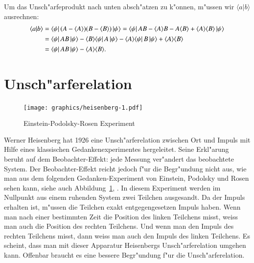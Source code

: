 Um das Unsch"arfeprodukt nach unten absch"atzen zu k"onnen, m"ussen
wir $\langle a|b\rangle$ ausrechnen:
\begin{align}
\langle a|b\rangle
&=
\langle\psi|\,
(A-\langle A\rangle)(B-\langle B\rangle)
\,|\psi\rangle
=
\langle\psi|\,
AB-\langle A\rangle B-A\langle B\rangle
+
\langle A\rangle\langle B\rangle
\,|\psi\rangle
\notag
\\
&=
\langle\psi|\,AB\,|\psi\rangle
-\langle B\rangle\langle\psi|\,A\,|\psi\rangle
-\langle A\rangle\langle\psi|\,B\,|\psi\rangle
+
\langle A\rangle\langle B\rangle
\notag
\\
&=
\langle\psi|\,AB\,|\psi\rangle
-
\langle A\rangle\langle B\rangle.
\label{skript:abausrechnung}
\end{align}

%
%
\section{Unsch"arferelation}
\begin{figure}
\centering
\texttt{[image: graphics/heisenberg-1.pdf]}
\caption{Einstein-Podolsky-Rosen Experiment
\label{skript:epr-experiment}}
\end{figure}
Werner Heisenberg hat 1926 eine Unsch"arferelation zwischen Ort und Impuls
mit Hilfe eines klassischen Gedankenexperimentes hergeleitet.
Seine Erkl"arung beruht auf dem Beobachter-Effekt: jede Messung
ver"andert das beobachtete System.
Der Beobachter-Effekt reicht jedoch f"ur die Begr"undung nicht
aus, wie man aus dem folgenden Gedanken-Experiment von Einstein,
Podolsky und Rosen sehen kann, siehe
auch Abbildung~\ref{skript:epr-experiment}, \cite{skript:epr}.
In diesem Experiment werden im Nullpunkt aus einem ruhenden System
zwei Teilchen ausgesandt.
Da der Impuls erhalten ist, m"ussen die Teilchen exakt entgegengesetzen
Impuls haben.
Wenn man nach einer bestimmten Zeit die Position des linken Teilchens misst,
weiss man auch die Position des rechten Teilchens.
Und wenn man den Impuls des rechten Teilchens misst, dann weiss
man auch den Impuls des linken Teilchens.
Es scheint, dass man mit dieser Apparatur Heisenbergs Unsch"arferelation
umgehen kann.
Offenbar braucht es eine bessere Begr"undung f"ur die Unsch"arferelation.

